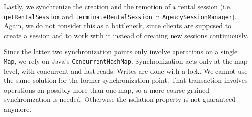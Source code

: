 Lastly, we synchronize the creation and the remotion of a rental session (i.e. \texttt{getRentalSession} and \texttt{terminateRentalSession} in \texttt{AgencySessionManager}). Again, we do not consider this as a bottleneck, since clients are supposed to create a session and to work with it instead of creating new sessions continuously.

Since the latter two synchronization points only involve operations on a single \texttt{Map}, we rely on Java's \texttt{ConcurrentHashMap}. Synchronization acts only at the map level, with concurrent and fast reads. Writes are done with a lock. We cannot use the same solution for the former synchronization point. That transaction involves operations on possibly more than one map, so a more coarse-grained synchronization is needed. Otherwise the isolation property is not guaranteed anymore.